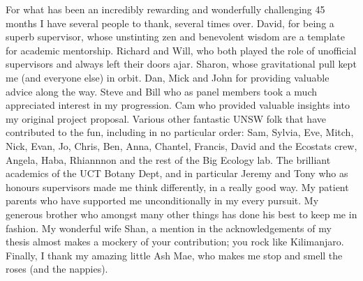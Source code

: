 
\begin{acknowledgements}      

For what has been an incredibly rewarding and wonderfully challenging 45 months I have several people to thank, several times over. David, for being a superb supervisor, whose unstinting zen and benevolent wisdom are a template for academic mentorship. Richard and Will, who both played the role of unofficial supervisors and always left their doors ajar. Sharon, whose gravitational pull kept me (and everyone else) in orbit. Dan, Mick and John for providing valuable advice along the way. Steve and Bill who as panel members took a much appreciated interest in my progression. Cam who provided valuable insights into my original project proposal. Various other fantastic UNSW folk that have contributed to the fun, including in no particular order: Sam, Sylvia, Eve, Mitch, Nick, Evan, Jo, Chris, Ben, Anna, Chantel, Francis, David and the Ecostats crew, Angela, Haba, Rhiannnon and the rest of the Big Ecology lab. The brilliant academics of the UCT Botany Dept, and in particular Jeremy and Tony who as honours supervisors made me think differently, in a really good way. My patient parents who have supported me unconditionally in my every pursuit. My generous brother who amongst many other things has done his best to keep me in fashion. My wonderful wife Shan, a mention in the acknowledgements of my thesis almost makes a mockery of your contribution; you rock like Kilimanjaro. Finally, I thank my amazing little Ash Mae, who makes me stop and smell the roses (and the nappies).


\end{acknowledgements}

